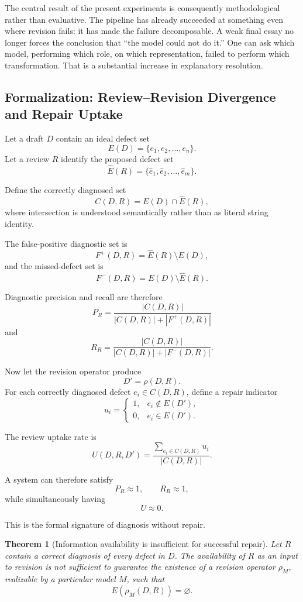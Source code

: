 \documentclass[11pt]{article}
\newtheorem{theorem}[definition]{Theorem}
\begin{document}
The central result of the present experiments is consequently methodological rather than evaluative. The pipeline has already succeeded at something even where revision fails: it has made the failure decomposable. A weak final essay no longer forces the conclusion that ``the model could not do it.'' One can ask which model, performing which role, on which representation, failed to perform which transformation. That is a substantial increase in explanatory resolution.

\subsection{Formalization: Review--Revision Divergence and Repair Uptake}

Let a draft \(D\) contain an ideal defect set
\[
    E(D)=\{e_1,e_2,\ldots,e_n\}.
\]
Let a review \(R\) identify the proposed defect set
\[
    \widehat{E}(R)
    =
    \{\hat e_1,\hat e_2,\ldots,\hat e_m\}.
\]

Define the correctly diagnosed set
\[
    C(D,R)
    =
    E(D)\cap\widehat{E}(R),
\]
where intersection is understood semantically rather than as literal string identity.

The false-positive diagnostic set is
\[
    F^+(D,R)
    =
    \widehat{E}(R)\setminus E(D),
\]
and the missed-defect set is
\[
    F^-(D,R)
    =
    E(D)\setminus\widehat{E}(R).
\]

Diagnostic precision and recall are therefore
\[
    P_R
    =
    \frac{|C(D,R)|}
         {|C(D,R)|+|F^+(D,R)|}
\]
and
\[
    R_R
    =
    \frac{|C(D,R)|}
         {|C(D,R)|+|F^-(D,R)|}.
\]

Now let the revision operator produce
\[
    D'=\rho(D,R).
\]
For each correctly diagnosed defect \(e_i\in C(D,R)\), define a repair indicator
\[
    u_i
    =
    \begin{cases}
    1, & e_i\notin E(D'),\\
    0, & e_i\in E(D').
    \end{cases}
\]

The review uptake rate is
\[
    U(D,R,D')
    =
    \frac{
        \sum_{e_i\in C(D,R)}u_i
    }{
        |C(D,R)|
    }.
\]

A system can therefore satisfy
\[
    P_R\approx1,
    \qquad
    R_R\approx1,
\]
while simultaneously having
\[
    U\approx0.
\]

This is the formal signature of diagnosis without repair.

\begin{theorem}[Information availability is insufficient for successful repair]
Let \(R\) contain a correct diagnosis of every defect in \(D\). The availability of \(R\) as an input to revision is not sufficient to guarantee the existence of a revision operator \(\rho_M\), realizable by a particular model \(M\), such that
\[
    E(\rho_M(D,R))=\varnothing.
\]
\end{theorem}
\end{document}
